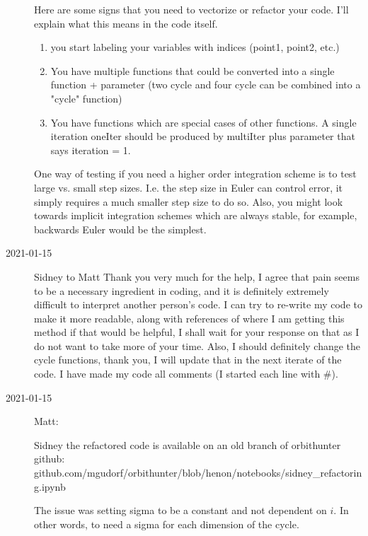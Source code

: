 \begin{description}
Here are some signs that you need to vectorize or refactor your code. I'll explain what this means in the code itself.
\begin{enumerate}
\item you start labeling your variables with indices (point1, point2, etc.)
\item You have multiple functions that could be converted into a single function + parameter (two cycle and four cycle can be combined into a "cycle" function)
\item You have functions which are special cases of other functions. A single iteration oneIter should be produced by multiIter plus parameter that says iteration = 1.
\end{enumerate}

One way of testing if you need a higher order integration scheme is to test large vs. small step sizes. I.e. the step size in Euler can control error, it simply requires
a much smaller step size to do so. Also, you might look towards implicit integration schemes which are always stable, for example, backwards Euler would be the simplest.

\item[2021-01-15] Sidney to Matt
Thank you very much for the help, I agree that pain seems to be a necessary ingredient in coding, and it is definitely extremely difficult to interpret another person's code. I can try to re-write my code to make it more readable, along with references of where I am getting this method if that would be helpful, I shall wait for your response on that as I do not want to take more of your time. Also, I should definitely change the cycle functions, thank you, I will update that in the next iterate of the code. I have made my code all comments (I started each line with \#).

\item[2021-01-15] Matt:

Sidney the refactored code is available on an old branch of orbithunter github: \\
{github.com/mgudorf/orbithunter/blob/henon/notebooks/sidney\_refactoring.ipynb}

The issue was setting sigma to be a constant and not dependent on $i$. In other words,
to need a sigma for each dimension of the cycle.


\end{description}

